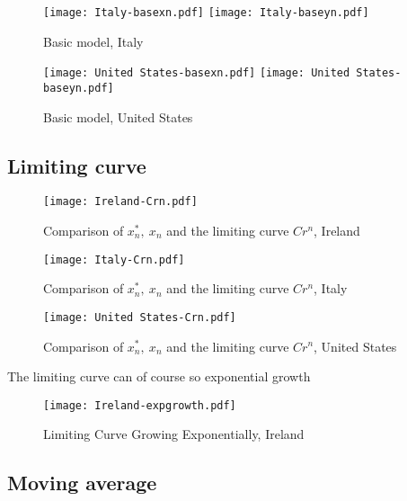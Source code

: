 \begin{figure}[H]
  \texttt{[image: Italy-basexn.pdf]} \label{fig:italy-basexn}
\endminipage\hfill
{}
  \texttt{[image: Italy-baseyn.pdf]} \label{fig:italy-baseyn}
\endminipage
\caption{Basic model, Italy}
\end{figure}

\begin{figure}[H]
  \texttt{[image: United States-basexn.pdf]} \label{fig:usa-basexn}
\endminipage\hfill
{}
  \texttt{[image: United States-baseyn.pdf]} \label{fig:usa-baseyn}
\endminipage
\caption{Basic model, United States}
\end{figure}

\subsection{Limiting curve}

\begin{figure}[H]
\texttt{[image: Ireland-Crn.pdf]}
\endminipage 
\caption{Comparison of $x^*_n,\ x_n$ and the limiting curve $Cr^n$, Ireland}
\end{figure}

\begin{figure}[H]
\texttt{[image: Italy-Crn.pdf]}
\endminipage 
\caption{Comparison of $x^*_n,\ x_n$ and the limiting curve $Cr^n$, Italy}
\end{figure}

\begin{figure}[H]
\texttt{[image: United States-Crn.pdf]}
\endminipage 
\caption{Comparison of $x^*_n,\ x_n$ and the limiting curve $Cr^n$, United States}
\end{figure}

The limiting curve can of course so exponential growth 

\begin{figure}[H]
\texttt{[image: Ireland-expgrowth.pdf]}
\endminipage 
\caption{Limiting Curve Growing Exponentially, Ireland}
\end{figure}

\subsection{Moving average}

